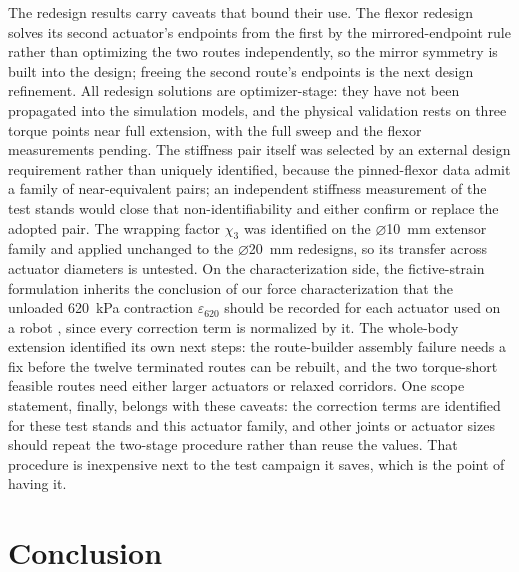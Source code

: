 \documentclass[utf8]{FrontiersinHarvard} %
\begin{document}
The redesign results carry caveats that bound their use. The flexor redesign solves its second actuator's endpoints from the first by the mirrored-endpoint rule rather than optimizing the two routes independently, so the mirror symmetry is built into the design; freeing the second route's endpoints is the next design refinement. All redesign solutions are optimizer-stage: they have not been propagated into the simulation models, and the physical validation rests on three torque points near full extension, with the full sweep and the flexor measurements pending. The stiffness pair itself was selected by an external design requirement rather than uniquely identified, because the pinned-flexor data admit a family of near-equivalent pairs; an independent stiffness measurement of the test stands would close that non-identifiability and either confirm or replace the adopted pair. The wrapping factor $\chi_{3}$ was identified on the $\diameter$\qty{10}{\mm} extensor family and applied unchanged to the $\diameter$\qty{20}{\mm} redesigns, so its transfer across actuator diameters is untested. On the characterization side, the fictive-strain formulation inherits the conclusion of our force characterization that the unloaded \qty{620}{\kPa} contraction $\varepsilon_{620}$ should be recorded for each actuator used on a robot \citep{bolen_2026}, since every correction term is normalized by it. The whole-body extension identified its own next steps: the route-builder assembly failure needs a fix before the twelve terminated routes can be rebuilt, and the two torque-short feasible routes need either larger actuators or relaxed corridors. One scope statement, finally, belongs with these caveats: the correction terms are identified for these test stands and this actuator family, and other joints or actuator sizes should repeat the two-stage procedure rather than reuse the values. That procedure is inexpensive next to the test campaign it saves, which is the point of having it.

\section{Conclusion}\label{sec:conclusion}
\end{document}
